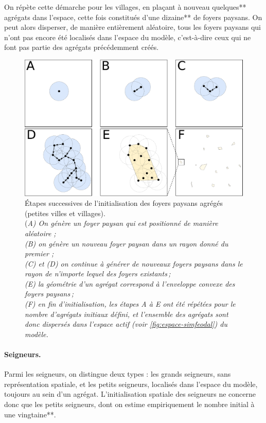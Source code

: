 On répète cette démarche pour les \og villages\fg{}, en plaçant à nouveau quelques** agrégats dans l'espace, cette fois constitués d'une dizaine** de foyers paysans.
On peut alors disperser, de manière entièrement aléatoire, tous les foyers paysans qui n'ont pas encore été localisés dans l'espace du modèle, c'est-à-dire ceux qui ne font pas partie des agrégats précédemment créés.

\begin{figure}[H]
	\centering
	\includegraphics[width=.98\linewidth]{img/init_fp.pdf}
	\caption[Étapes successives de l'initialisation des foyers paysans agrégés (petites villes et villages).]{Étapes successives de l'initialisation des foyers paysans agrégés (petites villes et villages).\\
	(\textit{A) On génère un foyer paysan qui est positionné de manière aléatoire ;\\
	(B) on génère un nouveau foyer paysan dans un rayon donné du premier ;\\
	(C) et (D) on continue à générer de nouveaux foyers paysans dans le rayon de n'importe lequel des foyers existants ;\\
	(E) la géométrie d'un agrégat correspond à l'enveloppe convexe des foyers paysans ;\\
	(F) en fin d'initialisation, les étapes A à E ont été répétées pour le nombre d'agrégats initiaux défini, et l'ensemble des agrégats sont donc dispersés dans l'espace actif (voir \cref{fig:espace-simfeodal}) du modèle.}}
	\label{fig:init-fp}
\end{figure}


\paragraph{Seigneurs.}
Parmi les seigneurs, on distingue deux types : les grands seigneurs, sans représentation spatiale, et les petits seigneurs, localisés dans l'espace du modèle, toujours au sein d'un agrégat.
L'initialisation spatiale des seigneurs ne concerne donc que les petits seigneurs, dont on estime empiriquement le nombre initial à une vingtaine**.

